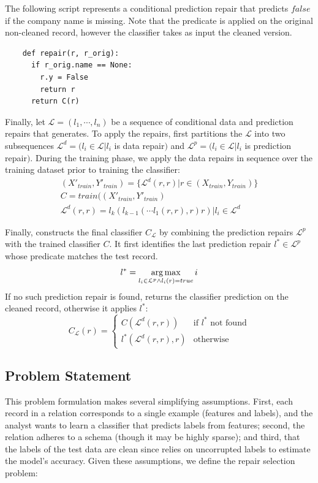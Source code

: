 \vspace{0.25em}
\begin{example}\sloppy
The following script represents a conditional prediction repair that 
predicts $false$ if the company name is missing.  Note that the predicate is applied on the original non-cleaned record, however the classifier takes as input the cleaned version.
{\small\begin{verbatim}
    def repair(r, r_orig):
      if r_orig.name == None:
        r.y = False
        return r
      return C(r)
\end{verbatim}}
\end{example}

\noindent Finally, let $\mathcal{L} = (l_1,\cdots,l_n)$ be a sequence of conditional data and prediction repairs that \sys generates. To apply the repairs, \sys first partitions the $\mathcal{L}$ into two subsequences $\mathcal{L}^d = (l_i \in \mathcal{L} | l_i$ is data repair$)$ and $\mathcal{L}^p = (l_i \in \mathcal{L} | l_i$ is prediction repair$)$.  During the training phase, we apply the data repairs in sequence over the training dataset prior to training the classifier:
\begin{align}
(X'_{train}, Y'_{train}) = \{\mathcal{L}^d(r, r) | r \in (X_{train}, Y_{train}) \}\\
C = train((X'_{train}, Y'_{train})\\
\mathcal{L}^d(r, r) = l_k(l_{k-1}(\cdots l_1(r, r), r) r) | l_i \in \mathcal{L}^d
\end{align}

Finally, \sys constructs the final classifier $C_{\mathcal{L}}$ by combining the prediction repairs $\mathcal{L}^p$ with the trained classifier $C$.  It first identifies the last prediction repair $l^* \in \mathcal{L}^p$ whose predicate matches the test record.  
$$l^* = \operatorname*{arg\,max}_{l_i \in \mathcal{L}^p \wedge l_i(r) = true} i$$
If no such prediction repair is found, \sys  returns the classifier prediction on the cleaned record, otherwise it applies $l^*$:
$$C_{\mathcal{L}}(r) = \begin{cases}
    C(\mathcal{L}^d(r, r))& \text{if } l^*\textrm{\ not\ found}\\
    l^*(\mathcal{L}^d(r, r), r) & \text{otherwise}
\end{cases}$$



\subsection{Problem Statement}
This problem formulation makes several simplifying assumptions.  
First, each record in a relation corresponds to a single example (features and labels), and the analyst wants to learn a classifier that predicts labels from features; second, the relation adheres to a schema (though it may be highly sparse); and third, that the labels of the test data are clean since \sys relies on uncorrupted labels to estimate the model's accuracy.
Given these assumptions, we define the repair selection problem:


